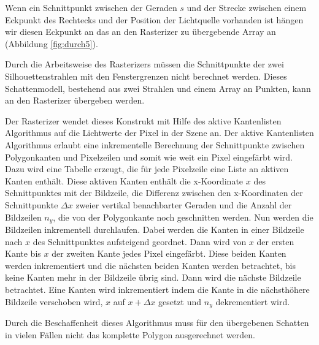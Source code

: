 Wenn ein Schnittpunkt zwischen der Geraden $s$ und der Strecke zwischen einem Eckpunkt des Rechtecks
und der Position der Lichtquelle vorhanden ist hängen wir diesen Eckpunkt an das an den Rasterizer
zu übergebende Array an (Abbildung \ref{fig:durch5}).

Durch die Arbeitsweise des Rasterizers müssen die Schnittpunkte der zwei Silhouettenstrahlen mit den
Fenstergrenzen nicht berechnet werden. Dieses Schattenmodell, bestehend aus zwei Strahlen und einem
Array an Punkten, kann an den Rasterizer übergeben werden.

Der Rasterizer wendet dieses Konstrukt mit Hilfe des aktive Kantenlisten Algorithmus auf die
Lichtwerte der Pixel in der Szene an. Der aktive Kantenlisten Algorithmus erlaubt eine inkrementelle
Berechnung der Schnittpunkte zwischen Polygonkanten und Pixelzeilen und somit wie weit ein Pixel
eingefärbt wird. Dazu wird eine Tabelle erzeugt, die für jede Pixelzeile eine Liste an aktiven Kanten
enthält. Diese aktiven Kanten enthält die x-Koordinate $x$ des Schnittpunktes mit der Bildzeile, die
Differenz zwischen den x-Koordinaten der Schnittpunkte $\Delta x$ zweier vertikal benachbarter
Geraden und die Anzahl der Bildzeilen $n_y$, die von der Polygonkante noch geschnitten werden. Nun
werden die Bildzeilen inkrementell durchlaufen. Dabei werden die Kanten in einer Bildzeile nach $x$
des Schnittpunktes aufsteigend geordnet. Dann wird von $x$ der ersten Kante bis $x$ der zweiten Kante
jedes Pixel eingefärbt. Diese beiden Kanten werden inkrementiert und die nächsten beiden Kanten werden
betrachtet, bis keine Kanten mehr in der Bildzeile übrig sind. Dann wird die nächste Bildzeile
betrachtet. Eine Kanten wird inkrementiert indem die Kante in die nächsthöhere Bildzeile verschoben
wird, $x$ auf $x + \Delta x$ gesetzt und $n_y$ dekrementiert wird.


Durch die Beschaffenheit dieses Algorithmus muss für den übergebenen Schatten in vielen Fällen nicht das komplette Polygon ausgerechnet werden.
